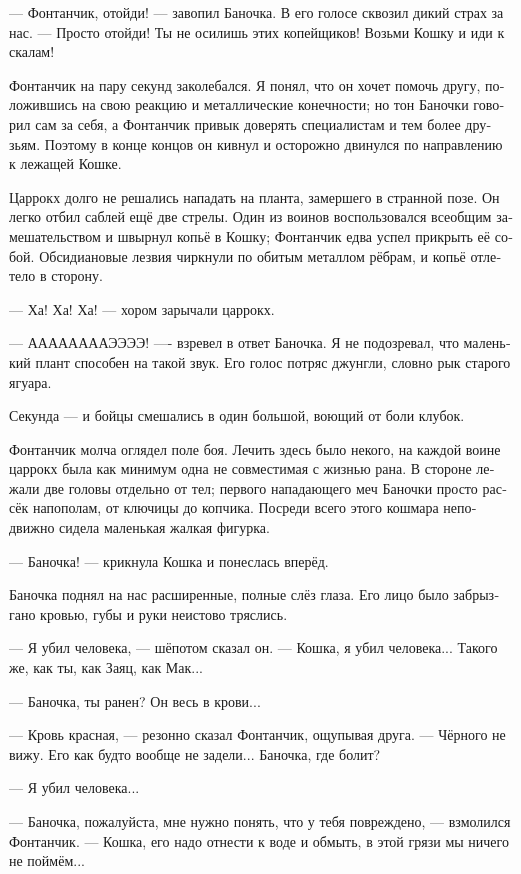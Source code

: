 \documentclass[a4paper,12pt,fleqn]{book}\usepackage{cooltooltips}\usepackage{polyglossia}\setdefaultlanguage[babelshorthands=true]{russian}\setotherlanguage{english}\defaultfontfeatures{Ligatures=TeX,Mapping=tex-text} \usepackage{xcolor}\definecolor{lightgray}{HTML}{bbbbbb}\color{lightgray}\newcommand{\ml}[3]{\textenglish{\textcolor{black}{#3}}}
\newcommand{\asterism}{\vspace{1em}{\centering\Large\bfseries$\ast~\ast~\ast$\par}\vspace{1em}}
\begin{document}
{--- Фонтанчик, отойди! --- завопил Баночка.
В его голосе сквозил дикий страх за нас.
--- Просто отойди!
Ты не осилишь этих копейщиков!
Возьми Кошку и иди к скалам!

Фонтанчик на пару секунд заколебался.
Я понял, что он хочет помочь другу, положившись на свою реакцию и металлические конечности;
но тон Баночки говорил сам за себя, а Фонтанчик привык доверять специалистам и тем более друзьям.
Поэтому в конце концов он кивнул и осторожно двинулся по направлению к лежащей Кошке.

Царрокх долго не решались нападать на планта, замершего в странной позе.
Он легко отбил саблей ещё две стрелы.
Один из воинов воспользовался всеобщим замешательством и швырнул копьё в Кошку;
Фонтанчик едва успел прикрыть её собой.
Обсидиановые лезвия чиркнули по обитым металлом рёбрам, и копьё отлетело в сторону.

--- Ха! Ха! Ха! --- хором зарычали царрокх.

--- ААААААААЭЭЭЭ! ---- взревел в ответ Баночка.
Я не подозревал, что маленький плант способен на такой звук.
Его голос потряс джунгли, словно рык старого ягуара.

Секунда --- и бойцы смешались в один большой, воющий от боли клубок.

\asterism

Фонтанчик молча оглядел поле боя.
Лечить здесь было некого, на каждой воине царрокх была как минимум одна не совместимая с жизнью рана.
В стороне лежали две головы отдельно от тел;
первого нападающего меч Баночки просто рассёк напополам, от ключицы до копчика.
Посреди всего этого кошмара неподвижно сидела маленькая жалкая фигурка.

--- Баночка! --- крикнула Кошка и понеслась вперёд.

Баночка поднял на нас расширенные, полные слёз глаза.
Его лицо было забрызгано кровью, губы и руки неистово тряслись.

--- Я убил человека, --- шёпотом сказал он.
--- Кошка, я убил человека...
Такого же, как ты, как Заяц, как Мак...

--- Баночка, ты ранен?
Он весь в крови...

--- Кровь красная, --- резонно сказал Фонтанчик, ощупывая друга.
--- Чёрного не вижу.
Его как будто вообще не задели...
Баночка, где болит?

--- Я убил человека...

--- Баночка, пожалуйста, мне нужно понять, что у тебя повреждено, --- взмолился Фонтанчик.
--- Кошка, его надо отнести к воде и обмыть, в этой грязи мы ничего не поймём...

}
\end{document}
